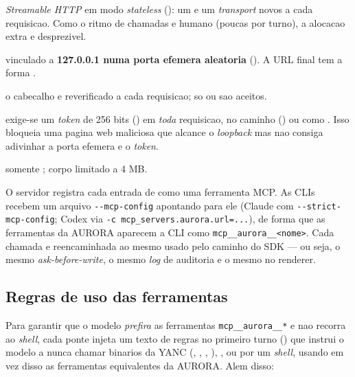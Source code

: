 \begin{description}[leftmargin=0pt, style=nextline]
  \item[Transporte] \emph{Streamable HTTP} em modo \emph{stateless} (): um  e um \emph{transport} novos a cada requisicao. Como o ritmo de chamadas e humano (poucas por turno), a alocacao extra e desprezivel.
  \item[Endereco] vinculado a \textbf{127.0.0.1 numa porta efemera aleatoria} (). A URL final tem a forma .
  \item[Defesa contra \emph{DNS rebinding}] o cabecalho  e reverificado a cada requisicao; so  ou  sao aceitos.
  \item[\emph{Token} de sessao] exige-se um \emph{token} de 256 bits () em \emph{toda} requisicao, no caminho () ou como . Isso bloqueia uma pagina web maliciosa que alcance o \emph{loopback} mas nao consiga adivinhar a porta efemera e o \emph{token}.
  \item[Metodo] somente ; corpo limitado a 4 MB.
\end{description}

O servidor registra cada entrada de  como uma
ferramenta MCP. As CLIs recebem um arquivo \lstinline|--mcp-config| apontando
para ele (Claude com \lstinline|--strict-mcp-config|; Codex via
\lstinline|-c mcp_servers.aurora.url=...|), de forma que as ferramentas da AURORA
aparecem a CLI como \lstinline|mcp__aurora__<nome>|. Cada chamada e reencaminhada
ao mesmo  usado pelo caminho do SDK --- ou seja, o
mesmo \emph{ask-before-write}, o mesmo \emph{log} de auditoria e o mesmo
 no renderer.

\subsection{Regras de uso das ferramentas}

Para garantir que o modelo \emph{prefira} as ferramentas \lstinline|mcp__aurora__*|
e nao recorra ao \emph{shell}, cada ponte injeta um texto de regras no primeiro
turno () que instrui o modelo a nunca chamar binarios da
YANC (, , , ), ,
 ou  por um \emph{shell}, usando em vez disso as
ferramentas equivalentes da AURORA. Alem disso:

